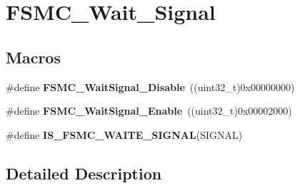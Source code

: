 \hypertarget{group___f_s_m_c___wait___signal}{\section{F\-S\-M\-C\-\_\-\-Wait\-\_\-\-Signal}
\label{group___f_s_m_c___wait___signal}
}
\subsection*{Macros}
\begin{DoxyCompactItemize}
\item 
\hypertarget{group___f_s_m_c___wait___signal_ga6ea66c8ddee073281c421533bdff7e19}{\#define {\bfseries F\-S\-M\-C\-\_\-\-Wait\-Signal\-\_\-\-Disable}~((uint32\-\_\-t)0x00000000)}\label{group___f_s_m_c___wait___signal_ga6ea66c8ddee073281c421533bdff7e19}

\item 
\hypertarget{group___f_s_m_c___wait___signal_gaf809e339f1cdc9d0a815fd98712e9ee3}{\#define {\bfseries F\-S\-M\-C\-\_\-\-Wait\-Signal\-\_\-\-Enable}~((uint32\-\_\-t)0x00002000)}\label{group___f_s_m_c___wait___signal_gaf809e339f1cdc9d0a815fd98712e9ee3}

\item 
\#define {\bfseries I\-S\-\_\-\-F\-S\-M\-C\-\_\-\-W\-A\-I\-T\-E\-\_\-\-S\-I\-G\-N\-A\-L}(S\-I\-G\-N\-A\-L)
\end{DoxyCompactItemize}


\subsection{Detailed Description}


